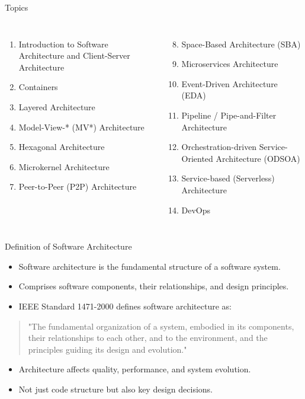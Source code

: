 \documentclass[aspectratio=169, table]{beamer}
\begin{document}
	\begin{frame}{Topics}
		\begin{columns}
			\begin{enumerate}
				\item Introduction to Software Architecture and Client-Server Architecture
				\item Containers
				\item Layered Architecture
				\item Model-View-* (MV*) Architecture
				\item Hexagonal Architecture
				\item Microkernel Architecture
				\item Peer-to-Peer (P2P) Architecture
			\end{enumerate}
			
			\begin{enumerate}
				\setcounter{enumi}{7}
				\item Space-Based Architecture (SBA)
				\item Microservices Architecture
				\item Event-Driven Architecture (EDA)
				\item Pipeline / Pipe-and-Filter Architecture
				\item Orchestration-driven Service-Oriented Architecture (ODSOA)
				\item Service-based (Serverless) Architecture
				\item DevOps
			\end{enumerate}
		\end{columns}
	\end{frame}
	
	
	\begin{frame}{Definition of Software Architecture}
		\begin{itemize}
			\item Software architecture is the fundamental structure of a software system.
			\item Comprises software components, their relationships, and design principles.
			\item IEEE Standard 1471-2000 defines software architecture as:
		\end{itemize}
		\begin{quote}
			"The fundamental organization of a system, embodied in its components, their relationships to each other, and to the environment, and the principles guiding its design and evolution."
		\end{quote}
		\begin{itemize}
			\item Architecture affects quality, performance, and system evolution.
			\item Not just code structure but also key design decisions.
		\end{itemize}
	\end{frame}
	
\end{document}
